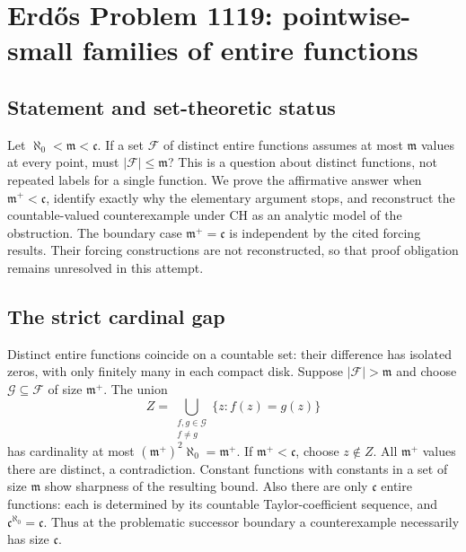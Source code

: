 \section*{Erd\H{o}s Problem 1119: pointwise-small families of entire functions}
\subsection*{Statement and set-theoretic status}
Let $\aleph_0<\mathfrak m<\mathfrak c$. If a set $\mathcal F$ of distinct entire functions assumes at most $\mathfrak m$ values at every point, must $|\mathcal F|\le\mathfrak m$? This is a question about distinct functions, not repeated labels for a single function.
We prove the affirmative answer when $\mathfrak m^+<\mathfrak c$, identify exactly why the elementary argument stops, and reconstruct the countable-valued counterexample under CH as an analytic model of the obstruction. The boundary case $\mathfrak m^+=\mathfrak c$ is independent by the cited forcing results. Their forcing constructions are not reconstructed, so that proof obligation remains unresolved in this attempt.

\subsection*{The strict cardinal gap}
Distinct entire functions coincide on a countable set: their difference has isolated zeros, with only finitely many in each compact disk. Suppose $|\mathcal F|>\mathfrak m$ and choose $\mathcal G\subseteq\mathcal F$ of size $\mathfrak m^+$. The union
\[
 Z=\bigcup_{\substack{f,g\in\mathcal G\\f\ne g}}\{z:f(z)=g(z)\}
\]
has cardinality at most $(\mathfrak m^+)^2\aleph_0=\mathfrak m^+$. If $\mathfrak m^+<\mathfrak c$, choose $z\notin Z$. All $\mathfrak m^+$ values there are distinct, a contradiction. Constant functions with constants in a set of size $\mathfrak m$ show sharpness of the resulting bound.
Also there are only $\mathfrak c$ entire functions: each is determined by its countable Taylor-coefficient sequence, and $\mathfrak c^{\aleph_0}=\mathfrak c$. Thus at the problematic successor boundary a counterexample necessarily has size $\mathfrak c$.

